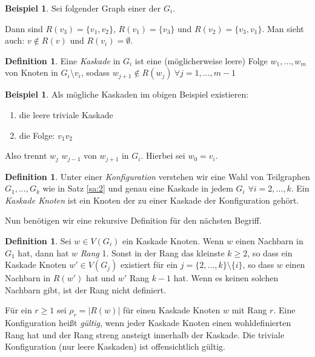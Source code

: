 \documentclass[12pt,a4paper]{scrartcl}
\numberwithin{equation}{section} %
\theoremstyle{definition}
\newtheorem{defn}[auf]{Definition}
\newtheorem{bsp}[auf]{Beispiel}
\theoremstyle{plain}
\newcommand{\abs}[1]{\left\vert #1\right\vert}
\begin{document}
\begin{bsp} Sei folgender Graph einer der $G_i$.
\begin{figure}[h]
    \centering
\end{figure}
Dann sind $R(v_3)=\lbrace v_1,v_2\rbrace$, $R(v_1)=\lbrace v_3\rbrace$ und $R(v_2)=\lbrace v_3, v_1\rbrace$. Man sieht auch: $v\not\in R(v)$ und $R(v_i)=\emptyset$.
\end{bsp}
\begin{defn}
Eine \emph{Kaskade} in $G_i$ ist eine (möglicherweise leere) Folge $w_1,\dotsc,w_m$ von Knoten in $G_i\setminus v_i$, sodass $w_{j+1}\not\in R(w_j)~\forall j=1,\dotsc,m-1$ 
\end{defn}
\begin{bsp}
Als mögliche Kaskaden im obigen Beispiel existieren: 
\begin{enumerate}
    \item die leere triviale Kaskade
    \item die Folge: $v_1 v_2$
\end{enumerate}
\end{bsp}
Also trennt $w_j$ $w_{j-1}$ von $w_{j+1}$ in $G_i$. Hierbei sei $w_0=v_i$. 
\begin{defn}
Unter einer \emph{Konfiguration} verstehen wir eine Wahl von Teilgraphen $G_1,\dotsc,G_k$ wie in Satz \ref{sa:2} und genau eine Kaskade in jedem $G_i$ $\forall i=2,\dotsc,k$. Ein \emph{Kaskade Knoten} ist ein Knoten der zu einer Kaskade der Konfiguration gehört.
\end{defn}
Nun benötigen wir eine rekursive Definition für den nächsten Begriff.
\begin{defn}
Sei $w\in V(G_i)$ ein Kaskade Knoten. Wenn $w$ einen Nachbarn in $G_1$ hat, dann hat $w$ \emph{Rang} 1. Sonst in der Rang das kleinste $k\ge 2$, so dass ein Kaskade Knoten $w'\in V(G_j)$ existiert für ein $j=\lbrace 2,\dotsc,k\rbrace\setminus \lbrace i\rbrace$, so dass $w$ einen Nachbarn in $R(w')$ hat und $w'$ Rang $k-1$ hat. Wenn es keinen solchen Nachbarn gibt, ist der Rang nicht definiert. \par
Für ein $r\ge 1$ sei $\rho_r=\abs{R(w)}$ für einen Kaskade Knoten $w$ mit Rang $r$. Eine Konfiguration heißt \emph{gültig}, wenn jeder Kaskade Knoten einen wohldefinierten Rang hat und der Rang streng ansteigt innerhalb der Kaskade. Die triviale Konfiguration (nur leere Kaskaden) ist offensichtlich gültig.
\end{defn}
\end{document}
